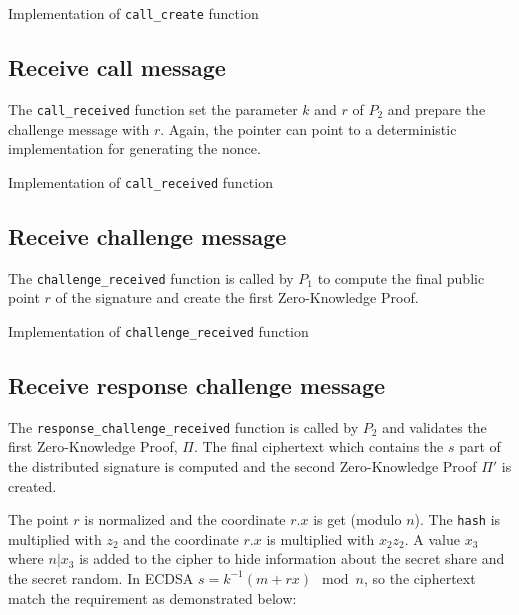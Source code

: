 \begin{longlisting}
	\caption{Implementation of \texttt{call\_create} function}
	\label{lst:implCallCreateFunc}
\end{longlisting}

\subsection{Receive call message}

The \texttt{call\_received} function set the parameter $k$ and $r$ of $P_2$ and
prepare the challenge message with $r$. Again, the pointer can point to a
deterministic implementation for generating the nonce.

\begin{longlisting}
	\caption{Implementation of \texttt{call\_received} function}
	\label{lst:implCallReceivedFunc}
\end{longlisting}

\subsection{Receive challenge message}

The \texttt{challenge\_received} function is called by $P_1$ to compute the
final public point $r$ of the signature and create the first Zero-Knowledge
Proof.

\begin{longlisting}
	\caption{Implementation of \texttt{challenge\_received} function}
	\label{lst:implChallengeReceivedFunc}
\end{longlisting}

\subsection{Receive response challenge message}

The \texttt{response\_challenge\_received} function is called by $P_2$ and
validates the first Zero-Knowledge Proof, $\Pi$. The final ciphertext which
contains the $s$ part of the distributed signature is computed and the second
Zero-Knowledge Proof $\Pi'$ is created.

The point $r$ is normalized and the coordinate $r.x$ is get (modulo $n$). The
\texttt{hash} is multiplied with $z_2$ and the coordinate $r.x$ is multiplied
with $x_2z_2$. A value $x_3$ where $n|x_3$ is added to the cipher to hide
information about the secret share and the secret random. In ECDSA $s = k^{-1}(m +
rx) \mod n$, so the ciphertext match the requirement as demonstrated below:

